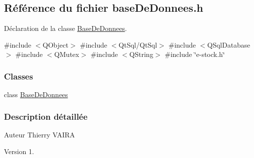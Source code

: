 \hypertarget{ihm-estock_2base_de_donnees_8h}{}\subsection{Référence du fichier base\+De\+Donnees.\+h}
\label{ihm-estock_2base_de_donnees_8h}


Déclaration de la classe \hyperlink{class_base_de_donnees}{Base\+De\+Donnees}.  


{\ttfamily \#include $<$Q\+Object$>$}\newline
{\ttfamily \#include $<$Qt\+Sql/\+Qt\+Sql$>$}\newline
{\ttfamily \#include $<$Q\+Sql\+Database$>$}\newline
{\ttfamily \#include $<$Q\+Mutex$>$}\newline
{\ttfamily \#include $<$Q\+String$>$}\newline
{\ttfamily \#include \char`\"{}e-\/stock.\+h\char`\"{}}\newline
\subsubsection*{Classes}
\begin{DoxyCompactItemize}
\item 
class \hyperlink{class_base_de_donnees}{Base\+De\+Donnees}
\end{DoxyCompactItemize}


\subsubsection{Description détaillée}
\begin{DoxyAuthor}{Auteur}
Thierry V\+A\+I\+RA
\end{DoxyAuthor}
\begin{DoxyVersion}{Version}
1. 
\end{DoxyVersion}
